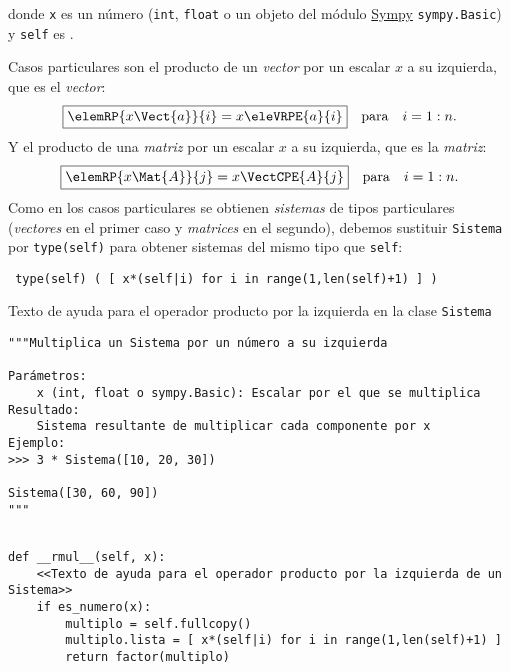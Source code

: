 \documentclass[11pt]{report}
\begin{document}
donde \texttt{x} es un número (\texttt{int}, \texttt{float} o un objeto del módulo \href{https://docs.sympy.org/latest/index.html}{Sympy}
\texttt{sympy.Basic}) y \texttt{self} es .

Casos particulares son el producto de un \emph{vector} 
por un escalar \(x\) a su izquierda, que es el \emph{vector}:
\begin{displaymath}
  \fbox{\begin{math} 
      \elemRP{x\Vect{a}}{i}=x \eleVRPE{a}{i}
  \end{math}}\quad\text{para}\quad i=1:n.
\end{displaymath}
Y el producto de una \emph{matriz}  por un escalar \(x\) a su
izquierda, que es la \emph{matriz}:
\begin{displaymath}
  \fbox{\begin{math} 
      \elemRP{x\Mat{A}}{j}=x\VectCPE{A}{j}
    \end{math}}\quad\text{para}\quad i=1:n.
\end{displaymath}
Como en los casos particulares se obtienen \emph{sistemas} de tipos
particulares (\emph{vectores} en el primer caso y \emph{matrices} en el
segundo), debemos sustituir \texttt{Sistema} por \texttt{type(self)} para
obtener sistemas del mismo tipo que \texttt{self}:
\begin{center}
  \Verb/ type(self) ( [ x*(self|i) for i in range(1,len(self)+1) ] ) /
\end{center}

Texto de ayuda para el operador producto por la izquierda en la clase \texttt{Sistema}
\begin{verbatim}
"""Multiplica un Sistema por un número a su izquierda

Parámetros:
    x (int, float o sympy.Basic): Escalar por el que se multiplica
Resultado:
    Sistema resultante de multiplicar cada componente por x
Ejemplo:
>>> 3 * Sistema([10, 20, 30]) 

Sistema([30, 60, 90]) 
"""
\end{verbatim}

\begin{verbatim}

def __rmul__(self, x):
    <<Texto de ayuda para el operador producto por la izquierda de un Sistema>>
    if es_numero(x):
        multiplo = self.fullcopy()
        multiplo.lista = [ x*(self|i) for i in range(1,len(self)+1) ]
        return factor(multiplo)

\end{verbatim}
\end{document}
